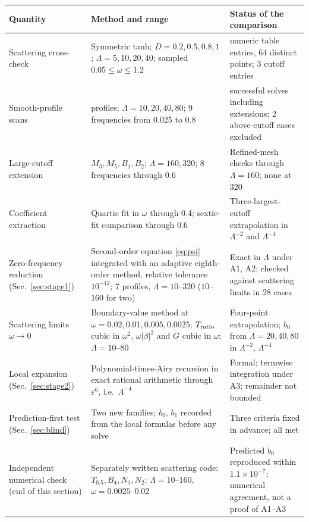 \documentclass[10pt,a4paper]{article}
\begin{document}
\begin{center}
\small
\begin{tabular}{@{}>{\raggedright\arraybackslash}p{.22\linewidth}
>{\raggedright\arraybackslash}p{.42\linewidth}
>{\raggedright\arraybackslash}p{.29\linewidth}@{}}
\toprule
Quantity & Method and range & Status of the comparison\\
\midrule
Scattering cross-check & Symmetric tanh; $D=0.2,0.5,0.8,1$;
$\Lambda=5,10,20,40$; sampled $0.05\leq\omega\leq1.2$ &
93 numeric table entries, 64 distinct points; 3 cutoff entries\\
Smooth-profile scans & 19 profiles; $\Lambda=10,20,40,80$;
9 frequencies from 0.025 to 0.8 & 746 successful solves including extensions;
2 above-cutoff cases excluded\\
Large-cutoff extension & $M_3,M_5,B_1,B_2$;
$\Lambda=160,320$; 8 frequencies through 0.6 & Refined-mesh checks through
$\Lambda=160$; none at 320\\
Coefficient extraction & Quartic fit in $\omega$ through 0.4;
sextic-fit comparison through 0.6 & Three-largest-cutoff extrapolation
in $\Lambda^{-2}$ and $\Lambda^{-4}$\\
\midrule
Zero-frequency reduction (Sec.~\ref{sec:stage1}) & Second-order equation
\eqref{eq:psi} integrated with an adaptive eighth-order method, relative
tolerance $10^{-12}$; 7 profiles, $\Lambda=10$--$320$ ($10$--$160$ for two) &
Exact in $\Lambda$ under A1, A2; checked against scattering limits in 28
cases\\
Scattering limits $\omega\to0$ & Boundary-value method at
$\omega=0.02,0.01,0.005,0.0025$; $T_{\rm ratio}$ cubic in $\omega^2$,
$\omega|\beta|^2$ and $G$ cubic in $\omega$; $\Lambda=10$--$80$ &
Four-point extrapolation; $b_0$ from $\Lambda=20,40,80$ in
$\Lambda^{-2}$, $\Lambda^{-4}$\\
Local expansion (Sec.~\ref{sec:stage2}) & Polynomial-times-Airy recursion
in exact rational arithmetic through $\varepsilon^6$, i.e.\ $\Lambda^{-4}$ &
Formal; termwise integration under A3; remainder not bounded\\
Prediction-first test (Sec.~\ref{sec:blind}) & Two new families;
$b_0$, $b_1$ recorded from the local formulas before any solve &
Three criteria fixed in advance; all met\\
Independent numerical check (end of this section) & Separately written scattering code;
$T_{0.5},B_4,N_1,N_2$; $\Lambda=10$--$160$, $\omega=0.0025$--$0.02$ &
Predicted $b_0$ reproduced within $1.1\times10^{-7}$; numerical
agreement, not a proof of A1--A3\\
\bottomrule
\end{tabular}
\end{center}
\end{document}
